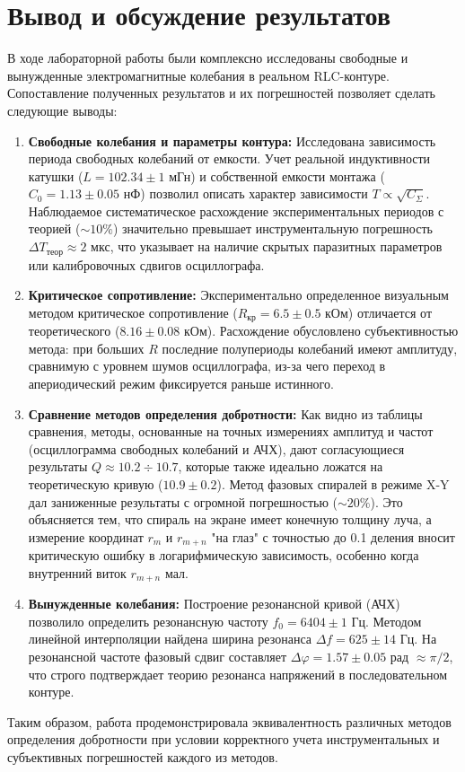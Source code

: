 \documentclass[a4paper,12pt]{extarticle}
\begin{document}
\section*{Вывод и обсуждение результатов}

В ходе лабораторной работы были комплексно исследованы свободные и вынужденные электромагнитные колебания в реальном RLC-контуре. Сопоставление полученных результатов и их погрешностей позволяет сделать следующие выводы:

\begin{enumerate}
    \item \textbf{Свободные колебания и параметры контура:} Исследована зависимость периода свободных колебаний от емкости. Учет реальной индуктивности катушки ($L = 102.34 \pm 1$ мГн) и собственной емкости монтажа ($C_0 = 1.13 \pm 0.05$ нФ) позволил описать характер зависимости $T \propto \sqrt{C_\Sigma}$. Наблюдаемое систематическое расхождение экспериментальных периодов с теорией ($\sim 10\%$) значительно превышает инструментальную погрешность $\Delta T_{\text{теор}} \approx 2$ мкс, что указывает на наличие скрытых паразитных параметров или калибровочных сдвигов осциллографа.
    
    \item \textbf{Критическое сопротивление:} Экспериментально определенное визуальным методом критическое сопротивление ($R_{\text{кр}} = 6.5 \pm 0.5$ кОм) отличается от теоретического ($8.16 \pm 0.08$ кОм). Расхождение обусловлено субъективностью метода: при больших $R$ последние полупериоды колебаний имеют амплитуду, сравнимую с уровнем шумов осциллографа, из-за чего переход в апериодический режим фиксируется раньше истинного.
    
    \item \textbf{Сравнение методов определения добротности:} Как видно из таблицы сравнения, методы, основанные на точных измерениях амплитуд и частот (осциллограмма свободных колебаний и АЧХ), дают согласующиеся результаты $Q \approx 10.2 \div 10.7$, которые также идеально ложатся на теоретическую кривую ($10.9 \pm 0.2$). Метод фазовых спиралей в режиме X-Y дал заниженные результаты с огромной погрешностью ($\sim 20\%$). Это объясняется тем, что спираль на экране имеет конечную толщину луча, а измерение координат $r_m$ и $r_{m+n}$ "на глаз" с точностью до 0.1 деления вносит критическую ошибку в логарифмическую зависимость, особенно когда внутренний виток $r_{m+n}$ мал.
    
    \item \textbf{Вынужденные колебания:} Построение резонансной кривой (АЧХ) позволило определить резонансную частоту $f_0 = 6404 \pm 1$ Гц. Методом линейной интерполяции найдена ширина резонанса $\Delta f = 625 \pm 14$ Гц. На резонансной частоте фазовый сдвиг составляет $\Delta\varphi = 1.57 \pm 0.05$ рад $\approx \pi/2$, что строго подтверждает теорию резонанса напряжений в последовательном контуре.
\end{enumerate}

Таким образом, работа продемонстрировала эквивалентность различных методов определения добротности при условии корректного учета инструментальных и субъективных погрешностей каждого из методов.
\end{document}
